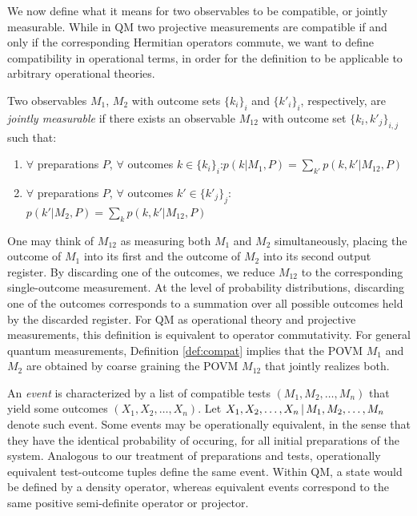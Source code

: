 We now define what it means for two observables to be compatible, or jointly measurable. While in QM two projective measurements are compatible if and only if the corresponding Hermitian operators commute, we want to define compatibility in operational terms, in order for the definition to be applicable to arbitrary operational theories.

\begin{definition}
\label{def:compat}
Two observables $M_{1}$, $M_{2}$ with outcome sets $\{k_i\}_i$ and $\{k'_i\}_{i}$, respectively, are \emph{jointly measurable} if there exists an observable $M_{12}$ with outcome set $\{k_i,k'_j\}_{i,j}$ such that:
\begin{enumerate}
\item $\forall$ preparations $P$, $\forall$ outcomes $k\in\{k_i\}_i$:\hfill\break $p(k\vert M_1,P)=\sum_{k'}p(k,k'\vert M_{12},P)$
\item $\forall$ preparations $P$, $\forall$ outcomes $k'\in\{k'_j\}_j$:\hfill\break $p(k'\vert M_2,P)=\sum_{k}p(k,k'\vert M_{12},P)$
\end{enumerate}
\end{definition}

\noindent One may think of $M_{12}$ as measuring both $M_{1}$ and $M_{2}$ simultaneously, placing the outcome of $M_{1}$ into its first and the outcome of $M_{2}$ into its second output register. By discarding one of the outcomes, we reduce $M_{12}$ to the corresponding single-outcome measurement. At the level of probability distributions, discarding one of the outcomes corresponds to a summation over all possible outcomes held by the discarded register. For QM as operational theory and projective measurements, this definition is equivalent to operator commutativity. For general quantum measurements, Definition \ref{def:compat} implies that the POVM $M_1$ and $M_2$ are obtained by coarse graining the POVM $M_{12}$ that jointly realizes both.

An \emph{event} is characterized by a list of compatible tests $(M_1, M_2, \dots, M_n)$ that yield some outcomes $(X_1, X_2, \dots, X_n)$. Let $X_1,X_2,\dots, X_n\thinspace\vert\thinspace M_1,M_2,\dots, M_n$ denote such event. Some events may be operationally equivalent, in the sense that they have the identical probability of occuring, for all initial preparations of the system. Analogous to our treatment of preparations and tests, operationally equivalent test-outcome tuples define the same event. Within QM, a state would be defined by a density operator, whereas equivalent events correspond to the same positive semi-definite operator or projector.

